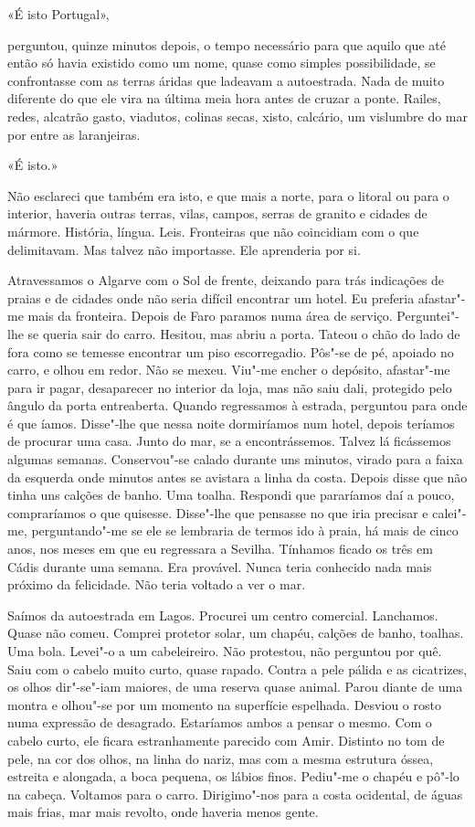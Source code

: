 «É isto Portugal»,

perguntou, quinze minutos depois, o tempo necessário para que aquilo que
até então só havia existido como um nome, quase como simples
possibilidade, se confrontasse com as terras áridas que ladeavam a
autoestrada. Nada de muito diferente do que ele vira na última meia
hora antes de cruzar a ponte. Railes, redes, alcatrão gasto, viadutos,
colinas secas, xisto, calcário, um vislumbre do mar por entre as
laranjeiras.

«É isto.»

Não esclareci que também era isto, e que mais a norte, para o litoral ou
para o interior, haveria outras terras, vilas, campos, serras de granito
e cidades de mármore. História, língua. Leis. Fronteiras que não
coincidiam com o que delimitavam. Mas talvez não importasse. Ele
aprenderia por si.

Atravessamos o Algarve com o Sol de frente, deixando para trás
indicações de praias e de cidades onde não seria difícil encontrar um
hotel. Eu preferia afastar"-me mais da fronteira. Depois de Faro paramos
numa área de serviço. Perguntei"-lhe se queria sair do carro. Hesitou,
mas abriu a porta. Tateou o chão do lado de fora como se temesse
encontrar um piso escorregadio. Pôs"-se de pé, apoiado no carro, e olhou
em redor. Não se mexeu. Viu"-me encher o depósito, afastar"-me para ir
pagar, desaparecer no interior da loja, mas não saiu dali, protegido
pelo ângulo da porta entreaberta. Quando regressamos à estrada,
perguntou para onde é que íamos. Disse"-lhe que nessa noite dormiríamos
num hotel, depois teríamos de procurar uma casa. Junto do mar, se a
encontrássemos. Talvez lá ficássemos algumas semanas. Conservou"-se
calado durante uns minutos, virado para a faixa da esquerda onde minutos
antes se avistara a linha da costa. Depois disse que não tinha uns
calções de banho. Uma toalha. Respondi que pararíamos daí a pouco,
compraríamos o que quisesse. Disse"-lhe que pensasse no que iria
precisar e calei"-me, perguntando"-me se ele se lembraria de termos ido
à praia, há mais de cinco anos, nos meses em que eu regressara a
Sevilha. Tínhamos ficado os três em Cádis durante uma semana. Era
provável. Nunca teria conhecido nada mais próximo da felicidade. Não
teria voltado a ver o mar.

Saímos da autoestrada em Lagos. Procurei um centro comercial.
Lanchamos. Quase não comeu. Comprei protetor solar, um chapéu, calções
de banho, toalhas. Uma bola. Levei"-o a um cabeleireiro. Não protestou,
não perguntou por quê. Saiu com o cabelo muito curto, quase rapado.
Contra a pele pálida e as cicatrizes, os olhos dir"-se"-iam maiores, de
uma reserva quase animal. Parou diante de uma montra e olhou"-se por um
momento na superfície espelhada. Desviou o rosto numa expressão de
desagrado. Estaríamos ambos a pensar o mesmo. Com o cabelo curto, ele
ficara estranhamente parecido com Amir. Distinto no tom de pele, na cor
dos olhos, na linha do nariz, mas com a mesma estrutura óssea, estreita
e alongada, a boca pequena, os lábios finos. Pediu"-me o chapéu e pô"-lo
na cabeça. Voltamos para o carro. Dirigimo"-nos para a costa ocidental,
de águas mais frias, mar mais revolto, onde haveria menos gente.

